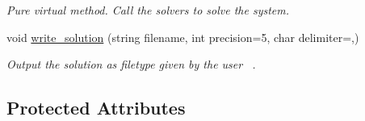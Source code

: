 \begin{DoxyCompactItemize}
\begin{DoxyCompactList}\small\item\em Pure virtual method. Call the solvers to solve the system. \end{DoxyCompactList}\item 
void \mbox{\hyperlink{class_o_d_e___system_a89537c37978b13e3540976bcb7fc603f}{write\+\_\+solution}} (string filename, int precision=5, char delimiter=\textquotesingle{},\textquotesingle{})
\begin{DoxyCompactList}\small\item\em Output the solution as filetype given by the user~\newline
. \end{DoxyCompactList}\end{DoxyCompactItemize}
\subsection*{Protected Attributes}
